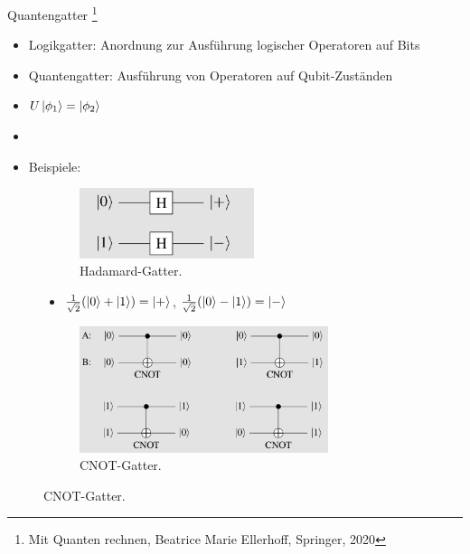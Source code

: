 \documentclass[aspectratio=1610, 9pt]{beamer}
\begin{document}
\begin{frame}{Quantengatter \footnote[14]{Mit Quanten rechnen, Beatrice Marie Ellerhoff, Springer, 2020}}
  \begin{itemize}
    \item Logikgatter: Anordnung zur Ausführung logischer Operatoren auf Bits
    \item Quantengatter: Ausführung von Operatoren auf Qubit-Zuständen
    \item $U \ket{\phi_1} = \ket{\phi_2}$
    \item[]
    \item Beispiele:
  \end{itemize}
  \begin{figure}
    \begin{minipage}{0.49\textwidth}
      \begin{figure}
          \includegraphics[width=0.56\textwidth]{images/Hadamard.png}
          \caption{Hadamard-Gatter. \footnotemark[14]}
      \end{figure}
      \begin{itemize}
        \item[] $\frac{1}{\sqrt{2}} (\ket{0} + \ket{1}) = \ket{+}$,  $\frac{1}{\sqrt{2}} (\ket{0} - \ket{1}) = \ket{-}$
      \end{itemize}
    \end{minipage}
    \hfill
    \begin{minipage}{0.49\textwidth}
      \begin{figure}
          \includegraphics[width=0.8\textwidth]{images/CNOT.png}
          \caption{CNOT-Gatter. \footnotemark[14]}
      \end{figure}
    \end{minipage}
  \end{figure}
\end{frame}
\end{document}
